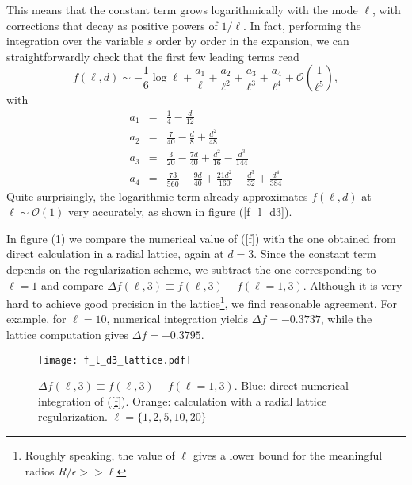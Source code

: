 \documentclass[12pt,a4paper]{article}
\begin{document}
This means that the constant term grows logarithmically with the mode $\ell$, with corrections that decay as positive powers of $1/\ell$. In fact, performing the integration over the variable $s$ order by order in the expansion, we can straightforwardly check that the first few leading terms read
\begin{equation}
f(\ell,d)\sim -\frac{1}{6}\log{\ell}+ \frac{a_1}{\ell}+\frac{a_2}{\ell^2}+\frac{a_3}{\ell^3}+\frac{a_4}{\ell^4}+\mathcal{O}\left(\frac{1}{\ell^5}\right),
\end{equation}
with 
\begin{eqnarray}\label{a1}
a_1&=&\frac{1}{4}-\frac{d}{12}\\ \label{a2}
a_2&=&\frac{7}{40}-\frac{d}{8}+\frac{d^2}{48}\\ \label{a3}
a_3&=&\frac{3}{20}-\frac{7 d}{40}+\frac{d^2}{16}-\frac{d^3}{144}\\ \label{a4}
a_4&=&\frac{73}{560}-\frac{9 d}{40}+\frac{21 d^2}{160}-\frac{d^3}{32}+\frac{d^4}{384} 
\end{eqnarray}
Quite surprisingly, the logarithmic term already approximates $f(\ell,d)$ at $\ell\sim \mathcal{O}(1)$ very accurately, as shown in figure (\ref{f_l_d3}). 


In figure (\ref{f_l_d3_lattice}) we compare the numerical value of (\ref{f}) with the one obtained from direct calculation in a radial lattice, again at $d=3$. Since the constant term depends on the regularization scheme, we subtract the one corresponding to $\ell=1$ and compare $\Delta f(\ell,3)\equiv f(\ell,3)-f( \ell=1,3)$. Although it is very hard to achieve good precision in the lattice\footnote{Roughly speaking, the value of $\ell$ gives a lower bound for the meaningful radios $R/\epsilon>>\ell$}, we find reasonable agreement. For example, for $\ell = 10$, numerical integration yields $\Delta f=-0.3737$, while the lattice computation gives $\Delta f=-0.3795$.
\begin{figure}[t]
\begin{center}  
\texttt{[image: f\_l\_d3\_lattice.pdf]}
\caption{$\Delta f(\ell,3)\equiv f(\ell,3)-f( \ell=1,3)$. Blue: direct numerical integration of (\ref{f}). Orange: calculation with a radial lattice regularization. $\ell=\lbrace 1, 2, 5, 10, 20\rbrace$}
\label{f_l_d3_lattice}
\end{center}  
\end{figure}
\end{document}
